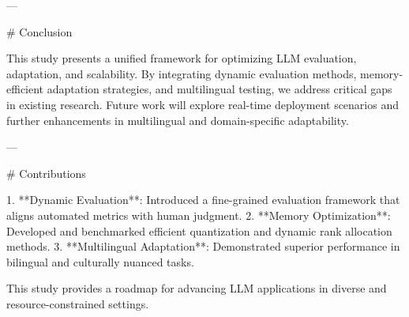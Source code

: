 ---

# Conclusion  

This study presents a unified framework for optimizing LLM evaluation, adaptation, and scalability. By integrating dynamic evaluation methods, memory-efficient adaptation strategies, and multilingual testing, we address critical gaps in existing research. Future work will explore real-time deployment scenarios and further enhancements in multilingual and domain-specific adaptability.  

---

# Contributions  

1. **Dynamic Evaluation**: Introduced a fine-grained evaluation framework that aligns automated metrics with human judgment.  
2. **Memory Optimization**: Developed and benchmarked efficient quantization and dynamic rank allocation methods.  
3. **Multilingual Adaptation**: Demonstrated superior performance in bilingual and culturally nuanced tasks.  

This study provides a roadmap for advancing LLM applications in diverse and resource-constrained settings.  